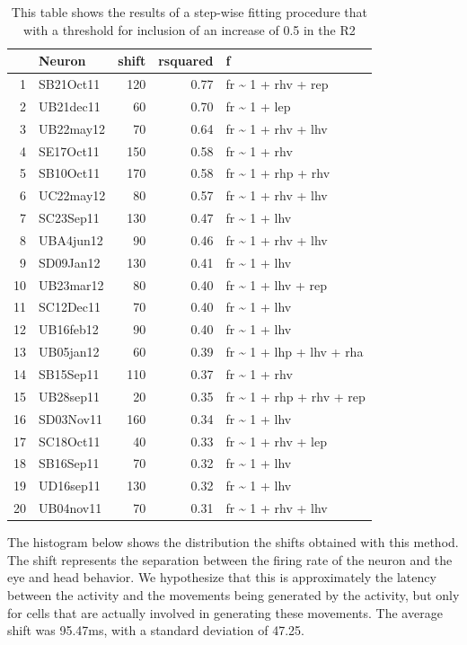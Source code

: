 \documentclass[]{article}
\begin{document}
\begin{table}[ht]
\centering
\begin{tabular}{rlrrl}
  \hline
 & Neuron & shift & rsquared & f \\ 
  \hline
1 & SB21Oct11 & 120 & 0.77 & fr \~{} 1 + rhv + rep \\ 
  2 & UB21dec11 &  60 & 0.70 & fr \~{} 1 + lep \\ 
  3 & UB22may12 &  70 & 0.64 & fr \~{} 1 + rhv + lhv \\ 
  4 & SE17Oct11 & 150 & 0.58 & fr \~{} 1 + rhv \\ 
  5 & SB10Oct11 & 170 & 0.58 & fr \~{} 1 + rhp + rhv \\ 
  6 & UC22may12 &  80 & 0.57 & fr \~{} 1 + rhv + lhv \\ 
  7 & SC23Sep11 & 130 & 0.47 & fr \~{} 1 + lhv \\ 
  8 & UBA4jun12 &  90 & 0.46 & fr \~{} 1 + rhv + lhv \\ 
  9 & SD09Jan12 & 130 & 0.41 & fr \~{} 1 + lhv \\ 
  10 & UB23mar12 &  80 & 0.40 & fr \~{} 1 + lhv + rep \\ 
  11 & SC12Dec11 &  70 & 0.40 & fr \~{} 1 + lhv \\ 
  12 & UB16feb12 &  90 & 0.40 & fr \~{} 1 + lhv \\ 
  13 & UB05jan12 &  60 & 0.39 & fr \~{} 1 + lhp + lhv + rha \\ 
  14 & SB15Sep11 & 110 & 0.37 & fr \~{} 1 + rhv \\ 
  15 & UB28sep11 &  20 & 0.35 & fr \~{} 1 + rhp + rhv + rep \\ 
  16 & SD03Nov11 & 160 & 0.34 & fr \~{} 1 + lhv \\ 
  17 & SC18Oct11 &  40 & 0.33 & fr \~{} 1 + rhv + lep \\ 
  18 & SB16Sep11 &  70 & 0.32 & fr \~{} 1 + lhv \\ 
  19 & UD16sep11 & 130 & 0.32 & fr \~{} 1 + lhv \\ 
  20 & UB04nov11 &  70 & 0.31 & fr \~{} 1 + rhv + lhv \\ 
   \hline
\end{tabular}
\caption{This table shows the results of a step-wise fitting procedure that with a threshold for inclusion of an increase of 0.5 in the R2} 
\end{table}

The histogram below shows the distribution the shifts obtained with this
method. The shift represents the separation between the firing rate of
the neuron and the eye and head behavior. We hypothesize that this is
approximately the latency between the activity and the movements being
generated by the activity, but only for cells that are actually involved
in generating these movements. The average shift was 95.47ms, with a
standard deviation of 47.25.
\end{document}
